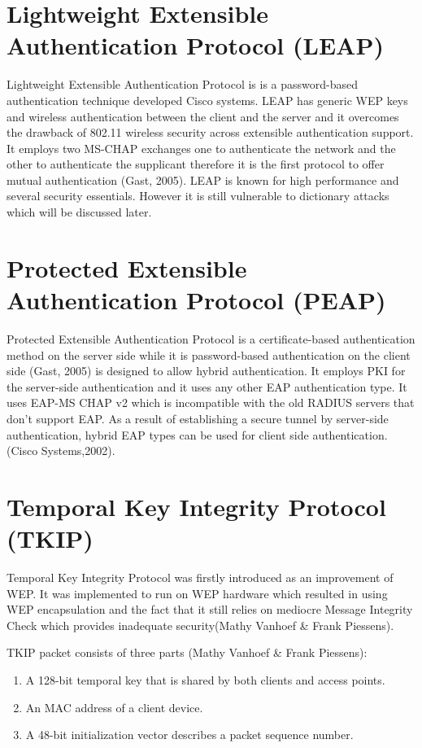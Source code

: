 \section{Lightweight Extensible Authentication Protocol (LEAP)}
Lightweight Extensible Authentication Protocol is  is a password-based authentication technique developed Cisco systems. LEAP has generic WEP keys and wireless authentication between the client and the server and it overcomes the drawback of 802.11 wireless security across extensible authentication support. It employs two MS-CHAP exchanges one to authenticate the network and the other to authenticate the supplicant therefore it is the first protocol to offer mutual authentication (Gast, 2005). LEAP is known for high performance and several security essentials. However it is still vulnerable to dictionary attacks which will be discussed later.



\section{Protected Extensible Authentication Protocol (PEAP)}

Protected Extensible Authentication Protocol is a certificate-based authentication method on the server side while it is password-based authentication on the client side (Gast, 2005) is designed to allow hybrid authentication. It employs PKI for the server-side authentication and it uses any other EAP authentication type. It uses EAP-MS CHAP v2 which is incompatible with the old RADIUS servers that don't support EAP. As a result of establishing a secure tunnel by server-side authentication, hybrid EAP types can be used for client side authentication. (Cisco Systems,2002).

\section{Temporal Key Integrity Protocol (TKIP)}

Temporal Key Integrity Protocol was firstly introduced as an improvement of WEP. It was implemented to run on WEP hardware which resulted in using WEP encapsulation and the fact that it still relies on mediocre Message Integrity Check which provides inadequate security(Mathy Vanhoef \& Frank Piessens).

TKIP packet consists of three parts (Mathy Vanhoef \& Frank Piessens):

\begin{enumerate}
  \item A 128-bit temporal key that is shared by both clients and access points.
  \item An MAC address of a client device.
  \item A 48-bit initialization vector describes a packet sequence number.
\end{enumerate}

